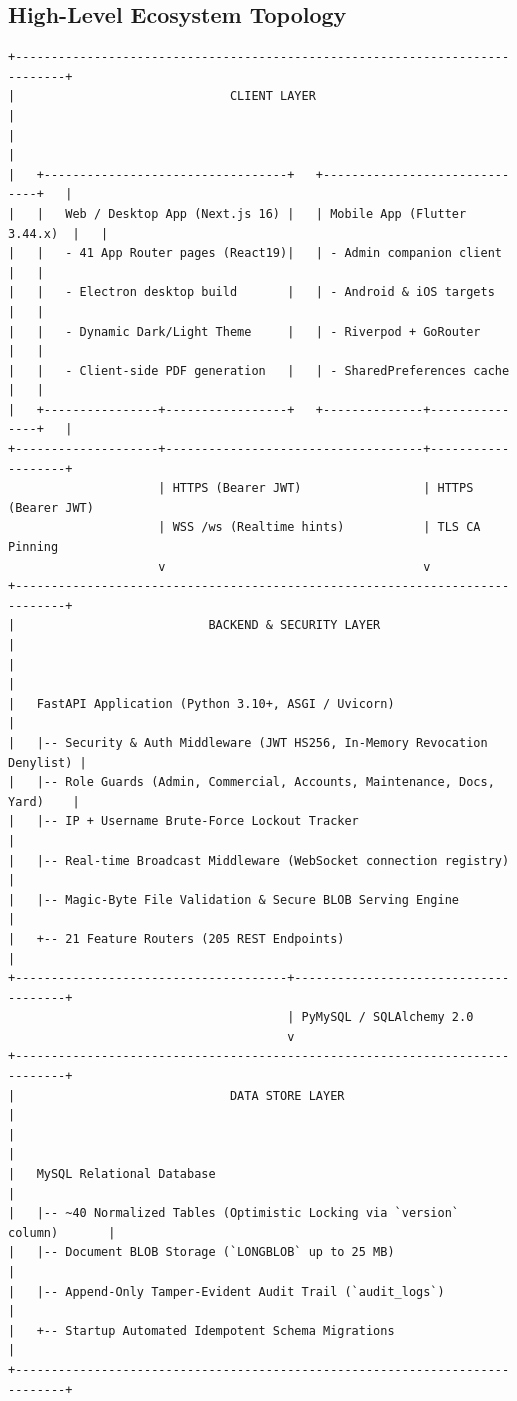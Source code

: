 \documentclass[11pt,a4paper]{article}
\begin{document}
\subsection*{High-Level Ecosystem Topology}
\begin{lstlisting}[style=asciiart]
+-----------------------------------------------------------------------------+
|                              CLIENT LAYER                                   |
|                                                                             |
|   +----------------------------------+   +------------------------------+   |
|   |   Web / Desktop App (Next.js 16) |   | Mobile App (Flutter 3.44.x)  |   |
|   |   - 41 App Router pages (React19)|   | - Admin companion client     |   |
|   |   - Electron desktop build       |   | - Android & iOS targets      |   |
|   |   - Dynamic Dark/Light Theme     |   | - Riverpod + GoRouter        |   |
|   |   - Client-side PDF generation   |   | - SharedPreferences cache    |   |
|   +----------------+-----------------+   +--------------+---------------+   |
+--------------------+------------------------------------+-------------------+
                     | HTTPS (Bearer JWT)                 | HTTPS (Bearer JWT)
                     | WSS /ws (Realtime hints)           | TLS CA Pinning
                     v                                    v
+-----------------------------------------------------------------------------+
|                           BACKEND & SECURITY LAYER                          |
|                                                                             |
|   FastAPI Application (Python 3.10+, ASGI / Uvicorn)                        |
|   |-- Security & Auth Middleware (JWT HS256, In-Memory Revocation Denylist) |
|   |-- Role Guards (Admin, Commercial, Accounts, Maintenance, Docs, Yard)    |
|   |-- IP + Username Brute-Force Lockout Tracker                             |
|   |-- Real-time Broadcast Middleware (WebSocket connection registry)        |
|   |-- Magic-Byte File Validation & Secure BLOB Serving Engine               |
|   +-- 21 Feature Routers (205 REST Endpoints)                               |
+--------------------------------------+--------------------------------------+
                                       | PyMySQL / SQLAlchemy 2.0
                                       v
+-----------------------------------------------------------------------------+
|                              DATA STORE LAYER                               |
|                                                                             |
|   MySQL Relational Database                                                 |
|   |-- ~40 Normalized Tables (Optimistic Locking via `version` column)       |
|   |-- Document BLOB Storage (`LONGBLOB` up to 25 MB)                        |
|   |-- Append-Only Tamper-Evident Audit Trail (`audit_logs`)                 |
|   +-- Startup Automated Idempotent Schema Migrations                        |
+-----------------------------------------------------------------------------+
\end{lstlisting}
\end{document}
